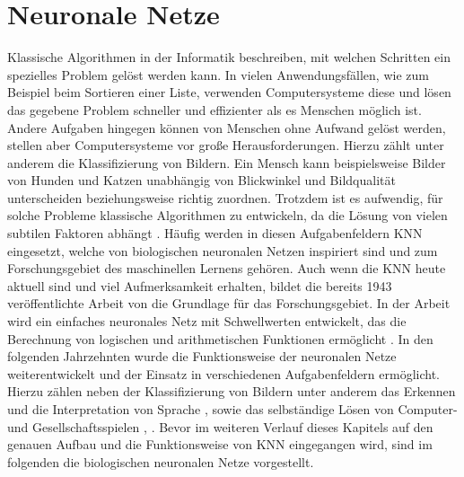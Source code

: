 \section{Neuronale Netze}
\label{sec:neuroal_networks}
Klassische Algorithmen in der Informatik beschreiben, mit welchen Schritten ein spezielles Problem gelöst werden kann. In vielen Anwendungsfällen, wie zum Beispiel beim Sortieren einer Liste, verwenden Computersysteme diese und lösen das gegebene Problem schneller und effizienter als es Menschen möglich ist. Andere Aufgaben hingegen können von Menschen ohne Aufwand gelöst werden, stellen aber Computersysteme vor große Herausforderungen. Hierzu zählt unter anderem die Klassifizierung von Bildern. Ein Mensch kann beispielsweise Bilder von Hunden und Katzen unabhängig von Blickwinkel und Bildqualität unterscheiden beziehungsweise richtig zuordnen. Trotzdem ist es aufwendig, für solche Probleme klassische Algorithmen zu entwickeln, da die Lösung von vielen subtilen Faktoren abhängt \cite{kriesel2008kleiner}. Häufig werden in diesen Aufgabenfeldern \ac{KNN} eingesetzt, welche von biologischen neuronalen Netzen inspiriert sind und zum Forschungsgebiet des maschinellen Lernens gehören. Auch wenn die \ac{KNN} heute aktuell sind und viel Aufmerksamkeit erhalten, bildet die bereits 1943 veröffentlichte Arbeit von \citeauthor{mcculloch1943logical} die Grundlage für das Forschungsgebiet. In der Arbeit wird ein einfaches neuronales Netz mit Schwellwerten entwickelt, das die Berechnung von logischen und arithmetischen Funktionen ermöglicht \cite{mcculloch1943logical}. In den folgenden Jahrzehnten wurde die Funktionsweise der neuronalen Netze weiterentwickelt und der Einsatz in verschiedenen Aufgabenfeldern ermöglicht. Hierzu zählen neben der Klassifizierung von Bildern \cite{krizhevsky2012imagenet} unter anderem das Erkennen und die Interpretation von Sprache \cite{hinton2012deep}, \cite{andor2016globally} sowie das selbständige Lösen von Computer- und Gesellschaftsspielen \cite{mnih2013playing}, \cite{silver2016mastering}. Bevor im weiteren Verlauf dieses Kapitels auf den genauen Aufbau und die Funktionsweise von \ac{KNN} eingegangen wird, sind im folgenden die biologischen neuronalen Netze vorgestellt.
